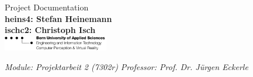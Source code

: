 
\begin{titlepage}
{\huge Project Documentation}\\
\textbf{heins4: Stefan Heinemann}\\
\textbf{ischc2: Christoph Isch}\\
\newline\newline\newline\newline\newline
\newline\newline\newline\newline\newline\newline\newline\newline\newline
\newline\newline\newline\newline\newline\newline\newline\newline
\includegraphics[width=46mm]{images/logo_ti.png}\newline

\emph{Module: Projektarbeit 2 (7302r)}\newline
\emph{Professor: Prof. Dr. Jürgen Eckerle}

\end{titlepage}
